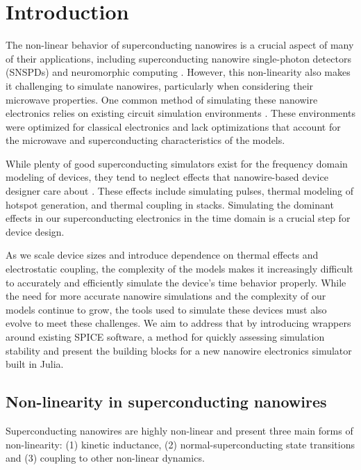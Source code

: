\chapter{Introduction}

The non-linear behavior of superconducting nanowires is a crucial aspect of many of their applications, including superconducting nanowire single-photon detectors (SNSPDs) and neuromorphic computing \cite{snspd_original_paper, spiking_nn}. However, this non-linearity also makes it challenging to simulate nanowires, particularly when considering their microwave properties. One common method of simulating these nanowire electronics relies on existing circuit simulation environments \cite{karl_spice}. These environments were optimized for classical electronics and lack optimizations that account for the microwave and superconducting characteristics of the models.

While plenty of good superconducting simulators exist for the frequency domain
modeling of devices, they tend to neglect effects that nanowire-based device 
designer care about \cite{josephsoncircsjl, wrspice}. These effects include simulating pulses, thermal modeling
of hotspot generation, and thermal coupling in stacks.
Simulating the dominant effects in our superconducting electronics in the time domain
is a crucial step for device design.

As we scale device sizes and introduce dependence on thermal effects and electrostatic coupling, the complexity of the models makes it increasingly difficult to accurately and efficiently simulate the device's time behavior properly.
While the need for more accurate nanowire simulations and the complexity of our models continue to grow, the tools used to simulate these devices must also evolve to meet these challenges. We aim to address that
by introducing wrappers around existing SPICE software, a method for quickly
assessing simulation stability and present the building blocks for a new
nanowire electronics simulator built in Julia.

\section{Non-linearity in superconducting nanowires}\label{nonlinearity}

Superconducting nanowires are highly non-linear and present three main forms of non-linearity:
(1) kinetic inductance, (2) normal-superconducting state transitions and
(3) coupling to other non-linear dynamics.

